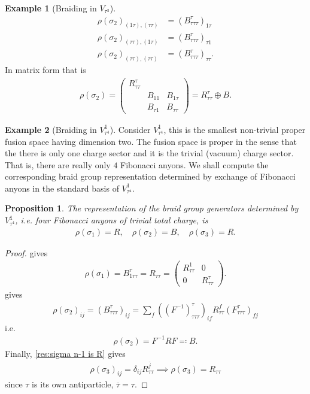 \documentclass[a4paper,10pt,oneside]{book}
\theoremstyle{plain}
\newtheorem{proposition}[theorem]{Proposition}
\theoremstyle{definition}
\newtheorem{example}{Example}[section]
\theoremstyle{remark}
\begin{document}
\begin{example}[Braiding in $V_{τ^3}$]
\begin{align*}
    ρ(σ_2)_{(1τ),(ττ)} &= \left(B_{τττ}^τ\right)_{1τ} \\
    ρ(σ_2)_{(ττ),(1τ)} &= \left(B_{τττ}^τ\right)_{τ1} \\
    ρ(σ_2)_{(ττ),(ττ)} &= \left(B_{τττ}^τ\right)_{ττ}.
  \end{align*}
  In matrix form that is
  \begin{align*}
    ρ(σ_2) =
    \begin{pmatrix}
      R_{ττ}^τ \\
      & B_{11} & B_{1τ} \\
      & B_{τ1} & B_{ττ}
    \end{pmatrix}
    = R_{ττ}^τ \oplus B.
  \end{align*}
\end{example}


\begin{example}[Braiding in $V_{τ^4}^1$]
  Consider $V_{τ^4}^1$, this is the smallest non-trivial proper fusion space having dimension two. The fusion space is proper in the sense that the there is only one charge sector and it is the trivial (vacuum) charge sector. That is, there are really only $4$ Fibonacci anyons. We shall compute the corresponding braid group representation determined by exchange of Fibonacci anyons in the standard basis of $V_{τ^4}^1$.

  \begin{proposition}
    The representation of the braid group generators determined by $V_{τ^4}^1$, i.e. four Fibonacci anyons of trivial total charge, is
    \begin{align*}
      ρ(σ_1) = R,\quad
      ρ(σ_2) = B,\quad
      ρ(σ_3) = R.
    \end{align*}
  \end{proposition}

  \begin{proof}
     gives
    \begin{align*}
      ρ(σ_1) = B_{1ττ}^{τ} = R_{ττ} =
      \begin{pmatrix}
        R_{ττ}^1 & 0 \\
        0 & R_{ττ}^τ
      \end{pmatrix}.
    \end{align*}
     gives
    \begin{align*}
      ρ(σ_2)_{ij} = \left( B^τ_{τττ} \right)_{ij} = \sum_f \left( \left(F^{-1}\right)_{τττ}^τ \right)_{if} R_{ττ}^f \left( F_{τττ}^τ \right)_{fj}
    \end{align*}
    i.e.
    \begin{align*}
      ρ(σ_2) = F^{-1} R F \eqqcolon B.
    \end{align*}
    Finally, \cref{res:sigma n-1 is R} gives
    \begin{align*}
      ρ(σ_3)_{ij} = \delta_{ij} R_{ττ}^{\overline{j}}
      \implies
      ρ(σ_3) = R_{ττ}
    \end{align*}
    since $τ$ is its own antiparticle, $\overline{τ} = τ$.
  \end{proof}
\end{example}
\end{document}

